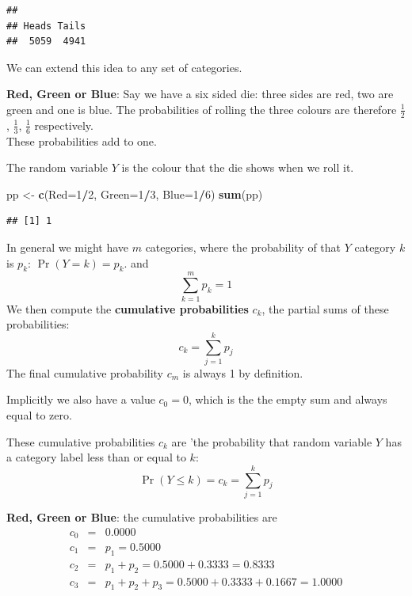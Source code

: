 \documentclass[
]{book}
\newenvironment{Shaded}{\begin{snugshade}}{\end{snugshade}}
\newcommand{\AttributeTok}[1]{\textcolor[rgb]{0.13,0.29,0.53}{#1}}
\newcommand{\DecValTok}[1]{\textcolor[rgb]{0.00,0.00,0.81}{#1}}
\newcommand{\FunctionTok}[1]{\textcolor[rgb]{0.13,0.29,0.53}{\textbf{#1}}}
\newcommand{\NormalTok}[1]{#1}
\newcommand{\OtherTok}[1]{\textcolor[rgb]{0.56,0.35,0.01}{#1}}
\newcommand{\SpecialCharTok}[1]{\textcolor[rgb]{0.81,0.36,0.00}{\textbf{#1}}}
\begin{document}
\begin{verbatim}
## 
## Heads Tails 
##  5059  4941
\end{verbatim}

We can extend this idea to any set of categories.

\textbf{Red, Green or Blue}: Say we have a six sided die: three sides are red, two are green and one is blue.
The probabilities of rolling the three colours are therefore \(\frac12\), \(\frac13\), \(\frac16\) respectively.\\
These probabilities add to one.

The random variable \(Y\) is the colour that the die shows when we roll it.

\begin{Shaded}
\begin{Highlighting}[]
\NormalTok{pp }\OtherTok{\textless{}{-}} \FunctionTok{c}\NormalTok{(}\AttributeTok{Red=}\DecValTok{1}\SpecialCharTok{/}\DecValTok{2}\NormalTok{, }\AttributeTok{Green=}\DecValTok{1}\SpecialCharTok{/}\DecValTok{3}\NormalTok{, }\AttributeTok{Blue=}\DecValTok{1}\SpecialCharTok{/}\DecValTok{6}\NormalTok{)}
\FunctionTok{sum}\NormalTok{(pp)}
\end{Highlighting}
\end{Shaded}

\begin{verbatim}
## [1] 1
\end{verbatim}

In general we might have \(m\) categories, where the probability of that \(Y\)
category \(k\) is \(p_k\): \(\Pr(Y=k)=p_k\). and
\[
   \sum_{k=1}^m p_k = 1
\]
We then compute the \textbf{cumulative probabilities} \(c_k\), the partial sums of these probabilities:
\[
   c_k = \sum_{j=1}^k p_j
\]
The final cumulative probability \(c_m\) is always 1 by definition.

Implicitly we also have a value \(c_0=0\), which is the the empty sum and always
equal to zero.

These cumulative probabilities \(c_k\) are 'the probability that random variable \(Y\) has
a category label less than or equal to \(k\):
\[
    \Pr(Y\leq k) = c_k = \sum_{j=1}^k p_j
\]

\textbf{Red, Green or Blue}: the cumulative probabilities are
\begin{eqnarray*}
  c_0 &=& 0.0000\\
  c_1 &=& p_1 = 0.5000\\
  c_2 &=& p_1+p_2 = 0.5000 + 0.3333 = 0.8333\\
  c_3 &=& p_1+p_2+p_3 = 0.5000 + 0.3333 + 0.1667 = 1.0000
\end{eqnarray*}
\end{document}

